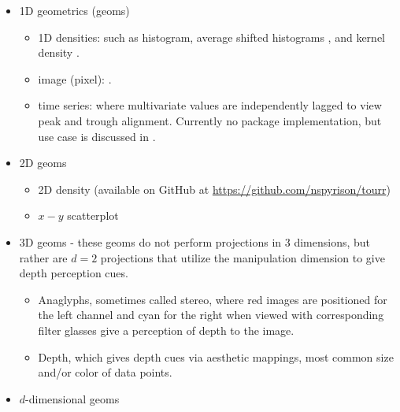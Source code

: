 \documentclass{monashthesis}
\begin{document}
\begin{itemize}
\tightlist
\item
  1D geometrics (geoms)

  \begin{itemize}
  \tightlist
  \item
    1D densities: such as histogram, average shifted histograms
    \autocite{scott_averaged_1985}, and kernel density
    \autocite{scott_incorporating_1995}.
  \item
    image (pixel): \autocite{wegman_pixel_2001}.
  \item
    time series: where multivariate values are independently lagged to
    view peak and trough alignment. Currently no package implementation,
    but use case is discussed in \autocite{cook_manual_1997}.
  \end{itemize}
\item
  2D geoms

  \begin{itemize}
  \tightlist
  \item
    2D density (available on GitHub at
    \url{https://github.com/nspyrison/tourr})
  \item
    \(x-y\) scatterplot
  \end{itemize}
\item
  3D geoms - these geoms do not perform projections in 3 dimensions, but
  rather are \(d=2\) projections that utilize the manipulation dimension
  to give depth perception cues.

  \begin{itemize}
  \tightlist
  \item
    Anaglyphs, sometimes called stereo, where red images are positioned
    for the left channel and cyan for the right when viewed with
    corresponding filter glasses give a perception of depth to the
    image.
  \item
    Depth, which gives depth cues via aesthetic mappings, most common
    size and/or color of data points.
  \end{itemize}
\item
  \(d\)-dimensional geoms


\end{itemize}
\end{document}
